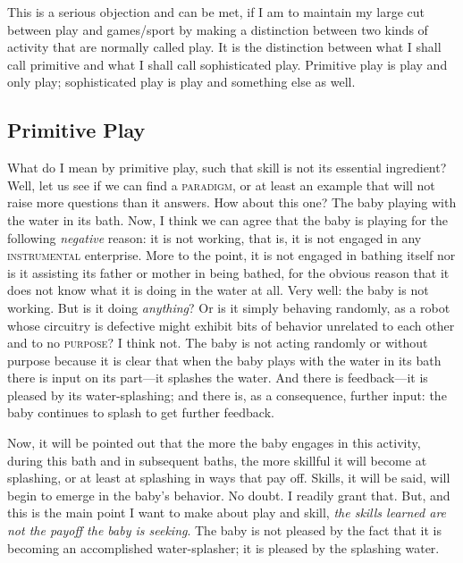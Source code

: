 \documentclass{tufte-handout}
\begin{document}
This is a serious objection and can be met, if I am to maintain my large cut between play and games/sport by making a distinction between two kinds of activity that are normally called play. It is the distinction between what I shall call primitive and what I shall call sophisticated play. \color{darkblue}Primitive play\color{Black} is play and only play; \color{darkblue}sophisticated play \color{Black} is play and something else as well.

\subsection{Primitive Play}

What do I mean by primitive play, such that skill is not its essential ingredient? Well, let us see if we can find a \textsc{paradigm}, or at least an example that will not raise more questions than it answers. How about this one? The baby playing with the water in its bath. Now, I think we can agree that the baby is playing for the following \textit{negative} reason: it is not working, that is, it is not engaged in any \textsc{instrumental} enterprise. More to the point, it is not engaged in bathing itself nor is it assisting its father or mother in being bathed, for the obvious reason that it does not know what it is doing in the water at all. Very well: the baby is not working. But is it doing \textit{anything}? Or is it simply behaving randomly, as a robot whose circuitry is defective might exhibit bits of behavior unrelated to each other and to no \textsc{purpose}? I think not. The baby is not acting randomly or without purpose because it is clear that when the baby plays with the water in its bath there is input on its part---it splashes the water. And there is feedback---it is pleased by its water-splashing; and there is, as a consequence, further input: the baby continues to splash to get further feedback. 

Now, it will be pointed out that the more the baby engages in this activity, during this bath and in subsequent baths, the more skillful it will become at splashing, or at least at splashing in ways that pay off. Skills, it will be said, will begin to emerge in the baby's behavior. No doubt. I readily grant that. But, and this is the main point I want to make about play and skill, \textit{the skills learned are not the payoff the baby is seeking}. The baby is not pleased by the fact that it is becoming an accomplished water-splasher; it is pleased by the splashing water. 
\end{document}
